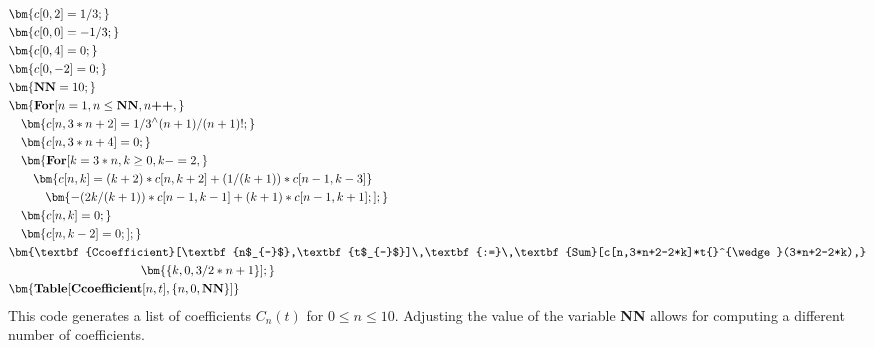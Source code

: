 \documentclass[11pt]{article}
\numberwithin{equation}{section}
\numberwithin{equation}{section}
\begin{document}
\[
\begin{aligned}
&\bm{c[0,2] = 1/3;} \\
&\bm{c[0,0] = -1/3;} \\
&\bm{c[0,4] = 0;} \\
&\bm{c[0,-2] = 0;} \\
&\bm{\textbf{NN} = 10;} \\
&\bm{\textbf{For}[n = 1, n \leq \textbf{NN}, n\textbf{++},} \\
&\quad \bm{c[n,3*n+2] = 1/3{}^{\wedge}(n+1)/(n+1)!;} \\
&\quad \bm{c[n,3*n+4] = 0;} \\
&\quad \bm{\textbf{For}[k = 3*n, k \geq 0, k-=2,} \\
&\quad \quad \bm{c[n,k] = (k+2)*c[n,k+2] + (1/(k+1))*c[n-1,k-3]} \\
&\quad \quad \quad \bm{- (2k/(k+1))*c[n-1,k-1] + (k+1)*c[n-1,k+1];];} \\
&\quad \bm{c[n,k] = 0;} \\
&\quad \bm{c[n,k-2] = 0;];} \\
&\bm{\textbf{Ccoefficient}[\textbf{n$_{-}$},\textbf{t$_{-}$}]\,\textbf{:=}\,\textbf{Sum}[c[n,3*n+2-2*k]*t{}^{\wedge}(3*n+2-2*k),}\\
& \hphantom{\textbf{Ccoefficient}[\textbf{n$_{-}$},\textbf{t$_{-}$}]\,\textbf{:=}\,} \bm{\{k,0,3/2*n+1\}];} \\
&\bm{\textbf{Table}[\textbf{Ccoefficient}[n,t],\{n,0,\textbf{NN}\}]}
\end{aligned}
\]
This code generates a list of coefficients $C_n(t)$ for $0\le n\le 10$. Adjusting the value of the variable \textbf{NN} allows for computing a different number of coefficients.
\end{document}
